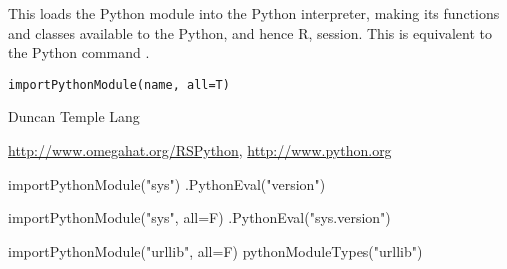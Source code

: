 \begin{Description}\relax
This loads the Python module into the Python interpreter,
making its functions and classes available to the Python, and hence R,
session. This is equivalent to the Python command
.\end{Description}
\begin{Usage}
\begin{verbatim}
importPythonModule(name, all=T)
\end{verbatim}
\end{Usage}
\begin{Arguments}
\begin{ldescription}
\item[\code{name}] 
\item[\code{all}] 
\end{ldescription}
\end{Arguments}
\begin{Value}
\end{Value}
\begin{Author}\relax
Duncan Temple Lang\end{Author}
\begin{References}\relax
\url{http://www.omegahat.org/RSPython},
\url{http://www.python.org}\end{References}
\begin{SeeAlso}\relax
{}\end{SeeAlso}
\begin{Examples}
\begin{ExampleCode}
  importPythonModule("sys")
  .PythonEval("version")

  importPythonModule("sys", all=F)
  .PythonEval("sys.version")


  importPythonModule("urllib", all=F)
  pythonModuleTypes("urllib")

\end{ExampleCode}
\end{Examples}

